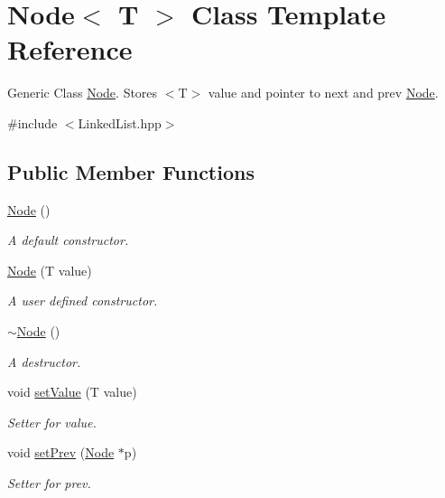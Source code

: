 \hypertarget{class_node}{}\section{Node$<$ T $>$ Class Template Reference}
\label{class_node}


Generic Class \mbox{\hyperlink{class_node}{Node}}. Stores $<$\+T$>$ value and pointer to next and prev \mbox{\hyperlink{class_node}{Node}}.  




{\ttfamily \#include $<$Linked\+List.\+hpp$>$}

\subsection*{Public Member Functions}
\begin{DoxyCompactItemize}
\item 
\mbox{\hyperlink{class_node_a0ac1d44cfe588be564acf25485029bd8}{Node}} ()
\begin{DoxyCompactList}\small\item\em A default constructor. \end{DoxyCompactList}\item 
\mbox{\hyperlink{class_node_aa72a44d0679a17d33d7a6f2b41790125}{Node}} (T value)
\begin{DoxyCompactList}\small\item\em A user defined constructor. \end{DoxyCompactList}\item 
\mbox{\hyperlink{class_node_ae923d0417581dd19784d55b901f0f7f0}{$\sim$\+Node}} ()
\begin{DoxyCompactList}\small\item\em A destructor. \end{DoxyCompactList}\item 
void \mbox{\hyperlink{class_node_afdabc78643a5cbab194de94274fa4f8d}{set\+Value}} (T value)
\begin{DoxyCompactList}\small\item\em Setter for value. \end{DoxyCompactList}\item 
void \mbox{\hyperlink{class_node_ac4a26ab24a7cfb8b9577d5b6d152a1dc}{set\+Prev}} (\mbox{\hyperlink{class_node}{Node}} $\ast$p)
\begin{DoxyCompactList}\small\item\em Setter for prev. \end{DoxyCompactList}\item 

\end{DoxyCompactItemize}
